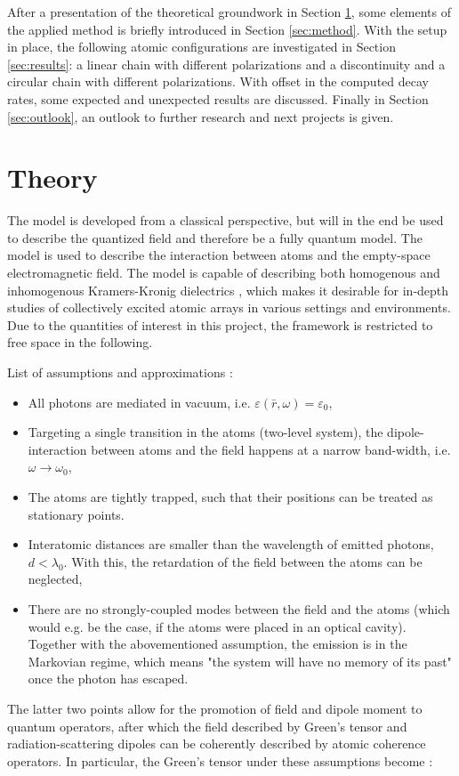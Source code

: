 \documentclass{article}
\begin{document}
After a presentation of the theoretical groundwork in Section \ref{sec:theory}, some elements of the applied method is briefly introduced in Section \ref{sec:method}. With the setup in place, the following atomic configurations are investigated in Section \ref{sec:results}: a linear chain with different polarizations and a discontinuity and a circular chain with different polarizations. With offset in the computed decay rates, some expected and unexpected results are discussed. Finally in Section \ref{sec:outlook}, an outlook to further research and next projects is given. 

\section{Theory}\label{sec:theory}

\noindent
The model is developed from a classical perspective, but will in the end be used to describe the quantized field and therefore be a fully quantum model. The model is used to describe the interaction between atoms and the empty-space electromagnetic field. The model is capable of describing both homogenous and inhomogenous Kramers-Kronig dielectrics \cite{Gruner}, which makes it desirable for in-depth studies of collectively excited atomic arrays in various settings and environments. Due to the quantities of interest in this project, the framework is restricted to free space in the following. 

List of assumptions and approximations \cite{Asenjo}:
\begin{itemize}\label{list:assumptions}
    \item All photons are mediated in vacuum, i.e. $\varepsilon(\bar{r},\omega) = \varepsilon_0$,
    \item Targeting a single transition in the atoms (two-level system), the dipole-interaction between atoms and the field happens at a narrow band-width, i.e. $\omega \rightarrow \omega_0$,
    \item The atoms are tightly trapped, such that their positions can be treated as stationary points. 
    \item Interatomic distances are smaller than the wavelength of emitted photons, $d < \lambda_0$. With this, the retardation of the field between the atoms can be neglected, 
    \item There are no strongly-coupled modes between the field and the atoms (which would e.g. be the case, if the atoms were placed in an optical cavity). Together with the abovementioned assumption, the emission is in the Markovian regime, which means "the system will have no memory of its past" \cite{Deutsch} once the photon has escaped. 
\end{itemize}
The latter two points allow for the promotion of field and dipole moment to quantum operators, after which the field described by Green's tensor and radiation-scattering dipoles can be coherently described by atomic coherence operators. In particular, the Green's tensor under these assumptions become \cite[Equation 6]{Asenjo}:
\end{document}
